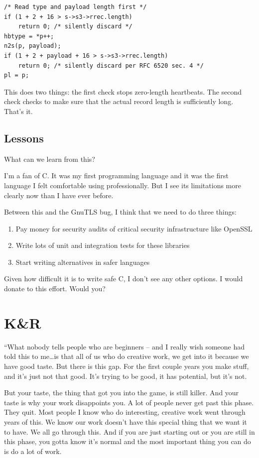\documentclass[10pt,twoside,openleft]{memoir}
\begin{document}
{\footnotesize
\begin{verbatim}
/* Read type and payload length first */
if (1 + 2 + 16 > s->s3->rrec.length)
    return 0; /* silently discard */
hbtype = *p++;
n2s(p, payload);
if (1 + 2 + payload + 16 > s->s3->rrec.length)
    return 0; /* silently discard per RFC 6520 sec. 4 */
pl = p;
\end{verbatim}
}

This does two things: the first check stops zero-length heartbeats. The second check checks to make sure that the actual record length is sufficiently long. That's it.

\section{Lessons}

What can we learn from this?

I'm a fan of C. It was my first programming language and it was the first language I felt comfortable using professionally. But I see its limitations more clearly now than I have ever before.

Between this and the GnuTLS bug, I think that we need to do three things:
\begin{enumerate}
 \item Pay money for security audits of critical security infrastructure like OpenSSL
 \item Write lots of unit and integration tests for these libraries
 \item Start writing alternatives in safer languages
\end{enumerate}
Given how difficult it is to write safe C, I don't see any other options. I would donate to this effort. Would you?

\chapter{K\&R}

``What nobody tells people who are beginners -- and I really wish someone had told this to me\dots is that all of us who do creative work, we get into it because we have good taste. But there is this gap. For the first couple years you make stuff, and it's just not that good. It's trying to be good, it has potential, but it's not.

But your taste, the thing that got you into the game, is still killer. And your taste is why your work disappoints you. A lot of people never get past this phase. They quit. Most people I know who do interesting, creative work went through years of this. We know our work doesn't have this special thing that we want it to have. We all go through this. And if you are just starting out or you are still in this phase, you gotta know it's normal and the most important thing you can do is do a lot of work.
\end{document}
